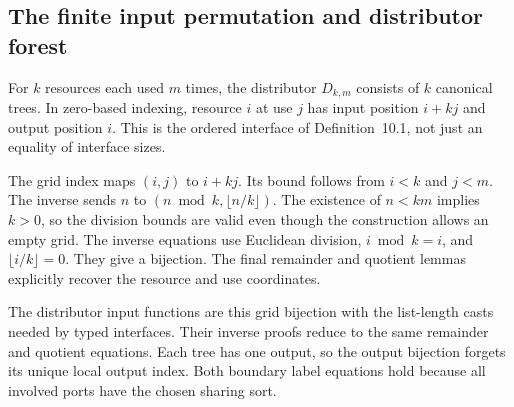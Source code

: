 



\subsection{The finite input permutation and distributor forest}
For $k$ resources each used $m$ times, the distributor $D_{k,m}$ consists of
$k$ canonical trees. In zero-based indexing, resource $i$ at use $j$ has input
position $i+kj$ and output position $i$. This is the ordered interface of
Definition~10.1, not just an equality of interface sizes.

The grid index maps $(i,j)$ to $i+kj$. Its bound follows from $i<k$ and
$j<m$. The inverse sends $n$ to $(n\bmod k,\lfloor n/k\rfloor)$.
The existence of $n<km$ implies $k>0$, so the division bounds are valid
even though the construction allows an empty grid. The inverse equations
use Euclidean division, $i\bmod k=i$, and $\lfloor i/k\rfloor=0$.
They give a bijection. The final remainder and quotient lemmas explicitly
recover the resource and use coordinates.








The distributor input functions are this grid bijection with the list-length
casts needed by typed interfaces. Their inverse proofs reduce to the same
remainder and quotient equations. Each tree has one output, so the output
bijection forgets its unique local output index. Both boundary label equations
hold because all involved ports have the chosen sharing sort.



